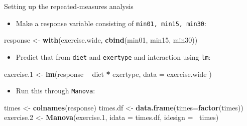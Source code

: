 \documentclass[
  ignorenonframetext,
]{beamer}
\newenvironment{Shaded}{\begin{snugshade}}{\end{snugshade}}
\newcommand{\DataTypeTok}[1]{\textcolor[rgb]{0.13,0.29,0.53}{#1}}
\newcommand{\FloatTok}[1]{\textcolor[rgb]{0.00,0.00,0.81}{#1}}
\newcommand{\KeywordTok}[1]{\textcolor[rgb]{0.13,0.29,0.53}{\textbf{#1}}}
\newcommand{\NormalTok}[1]{#1}
\newcommand{\OperatorTok}[1]{\textcolor[rgb]{0.81,0.36,0.00}{\textbf{#1}}}
\newcommand{\StringTok}[1]{\textcolor[rgb]{0.31,0.60,0.02}{#1}}
\providecommand{\tightlist}{%
  \setlength{\itemsep}{0pt}\setlength{\parskip}{0pt}}
\begin{document}
\begin{frame}[fragile]{Setting up the repeated-measures analysis}
\protect\hypertarget{setting-up-the-repeated-measures-analysis}{}

\begin{itemize}
\tightlist
\item
  Make a response variable consisting of \texttt{min01,\ min15,\ min30}:
\end{itemize}

\small

\begin{Shaded}
\begin{Highlighting}[]
\NormalTok{response <-}\StringTok{ }\KeywordTok{with}\NormalTok{(exercise.wide, }\KeywordTok{cbind}\NormalTok{(min01, min15, min30))}
\end{Highlighting}
\end{Shaded}

\normalsize

\begin{itemize}
\tightlist
\item
  Predict that from \texttt{diet} and \texttt{exertype} and interaction
  using \texttt{lm}:
\end{itemize}

\small

\begin{Shaded}
\begin{Highlighting}[]
\NormalTok{exercise}\FloatTok{.1}\NormalTok{ <-}\StringTok{ }\KeywordTok{lm}\NormalTok{(response }\OperatorTok{~}\StringTok{ }\NormalTok{diet }\OperatorTok{*}\StringTok{ }\NormalTok{exertype,}
  \DataTypeTok{data =}\NormalTok{ exercise.wide}
\NormalTok{)}
\end{Highlighting}
\end{Shaded}

\normalsize

\begin{itemize}
\tightlist
\item
  Run this through \texttt{Manova}:
\end{itemize}

\small

\begin{Shaded}
\begin{Highlighting}[]
\NormalTok{times <-}\StringTok{ }\KeywordTok{colnames}\NormalTok{(response)}
\NormalTok{times.df <-}\StringTok{ }\KeywordTok{data.frame}\NormalTok{(}\DataTypeTok{times=}\KeywordTok{factor}\NormalTok{(times))}
\NormalTok{exercise}\FloatTok{.2}\NormalTok{ <-}\StringTok{ }\KeywordTok{Manova}\NormalTok{(exercise}\FloatTok{.1}\NormalTok{, }
                     \DataTypeTok{idata =}\NormalTok{ times.df, }
                     \DataTypeTok{idesign =} \OperatorTok{~}\NormalTok{times)}
\end{Highlighting}
\end{Shaded}

\normalsize

\end{frame}
\end{document}
